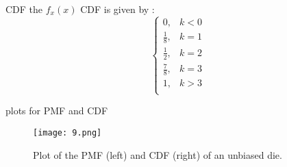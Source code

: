 \documentclass{beamer}
\begin{document}
\begin{frame}{CDF}
    the $f_x(x)$ CDF is given by :
 \begin{equation}
 \begin{cases}
 0, & k < 0 \\
 \frac{1}{8}, & k = 1 \\
 \frac{1}{2}, & k = 2 \\
 \frac{7}{8}, & k = 3 \\
 1, & k> 3 \\ 
 \end{cases}
 \label{cdf}
 \end{equation}
\end{frame}

\begin{frame}{plots for PMF and CDF}
  \begin{figure}[!ht]
\centering
\texttt{[image: 9.png]}
\caption{Plot of the PMF (left) and CDF (right) of an unbiased die.}
\label{fig:pmf-cdf}
\end{figure}
   
\end{frame}
\end{document}
